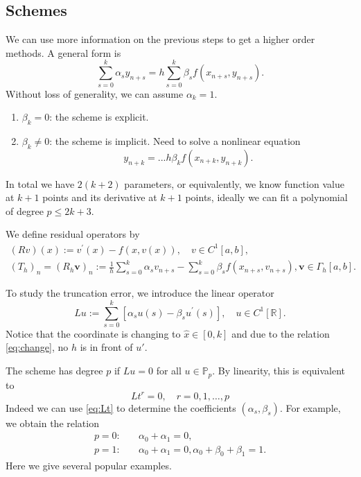 \documentclass[10pt]{amsart}
\begin{document}
\subsection{Schemes}
We can use more information on the previous steps to get a higher order methods. A general form is
\begin{equation}\label{eq:multistep}
\sum_{s=0}^k \alpha_s y_{n+s} = h\sum_{s=0}^k \beta_s f(x_{n+s}, y_{n+s}).
\end{equation}
Without loss of generality, we can assume $\alpha_k = 1$. 
\begin{enumerate}[1.]
\item $\beta_k = 0$: the scheme is explicit. 
\item $\beta_k \neq 0$: the scheme is implicit. Need to solve a nonlinear equation 
$$
y_{n+k} = ... h\beta_k f(x_{n+k}, y_{n+k}). 
$$
\end{enumerate}
In total we have $2(k+2)$ parameters, or equivalently, we know function value at $k+1$ points and its derivative at $k+1$ points, ideally we can fit a polynomial of degree $p \leq 2k+3$. 

We define residual operators by
\begin{equation}
\begin{gathered}
(R {v})(x):={v}^{\prime}(x)-{f}(x, {v}(x)), \quad {v} \in C^1[a, b], \\
(T_h)_n = \left(R_h \boldsymbol{v}\right)_n:=\frac{1}{h} \sum_{s=0}^k \alpha_s {v}_{n+s}-\sum_{s=0}^k \beta_s {f}\left(x_{n+s}, {v}_{n+s}\right), \boldsymbol{v} \in \Gamma_h[a, b].
\end{gathered}
\end{equation}

To study the truncation error, we introduce the linear operator 
$$
L u:=\sum_{s=0}^k\left[\alpha_s u(s)-\beta_s u^{\prime}(s)\right], \quad u \in C^1[\mathbb{R}] .
$$
Notice that the coordinate is changing to $\hat x\in [0,k]$ and due to the relation \eqref{eq:change}, no $h$ is in front of $u'$. 

The scheme has degree $p$ if $L u=0$ for all $u \in \mathbb{P}_p$. By linearity, this is equivalent to
\begin{equation}\label{eq:Lt}
L t^r=0, \quad r=0,1, \ldots, p
\end{equation}
Indeed we can use \eqref{eq:Lt} to determine the coefficients $(\alpha_s, \beta_s)$. For example,  we obtain the relation
$$
\begin{aligned}
p= 0: & \quad \alpha_0 + \alpha_1 = 0,\\
p= 1: & \quad \alpha_0 + \alpha_1 = 0, \alpha_0 + \beta_0 + \beta_1 = 1.
\end{aligned}
$$
Here we give several popular examples.
\end{document}
